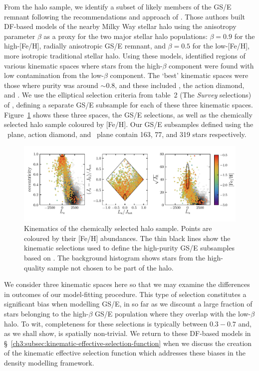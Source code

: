From the halo sample, we identify a subset of likely members of the GS/E remnant following the recommendations and approach of \cite{lane22}. Those authors built DF-based models of the nearby Milky Way stellar halo using the anisotropy parameter $\beta$ as a proxy for the two major stellar halo populations: $\beta=0.9$ for the high-[Fe/H], radially anisotropic GS/E remnant, and $\beta=0.5$ for the low-[Fe/H], more isotropic traditional stellar halo. Using these models, \cite{lane22} identified regions of various kinematic spaces where stars from the high-$\beta$ component were found with low contamination from the low-$\beta$ component. The `best' kinematic spaces were those where purity was around $\sim 0.8$, and these included \eLz, the action diamond, and \JRLz. We use the elliptical selection criteria from table~2 (The \textit{Survey} selections) of \cite{lane22}, defining a separate GS/E subsample for each of these three kinematic spaces. Figure~\ref{ch3:fig:halo_kinematics} shows these three spaces, the GS/E selections, as well as the chemically selected halo sample coloured by [Fe/H]. Our GS/E subsamples defined using the \eLz\ plane, action diamond, and \JRLz\ plane contain 163, 77, and 319 stars respectively.

\begin{figure}
    \centering
    \includegraphics[width=\textwidth]{figure/ch3/halo_kinematics.pdf}
    \caption{Kinematics of the chemically selected halo sample. Points are coloured by their [Fe/H] abundances. The thin black lines show the kinematic selections used to define the high-purity GS/E subsamples based on \cite{lane22}. The background histogram shows stars from the high-quality sample not chosen to be part of the halo.}
    \label{ch3:fig:halo_kinematics}
\end{figure}

We consider three kinematic spaces here so that we may examine the differences in outcomes of our model-fitting procedure. This type of selection constitutes a significant bias when modelling GS/E, in so far as we discount a large fraction of stars belonging to the high-$\beta$ GS/E population where they overlap with the low-$\beta$ halo. To wit, completeness for these selections is typically between $0.3-0.7$ and, as we shall show, is spatially non-trivial. We return to these DF-based models in \S~\ref{ch3:subsec:kinematic-effective-selection-function} when we discuss the creation of the kinematic effective selection function which addresses these biases in the density modelling framework.


